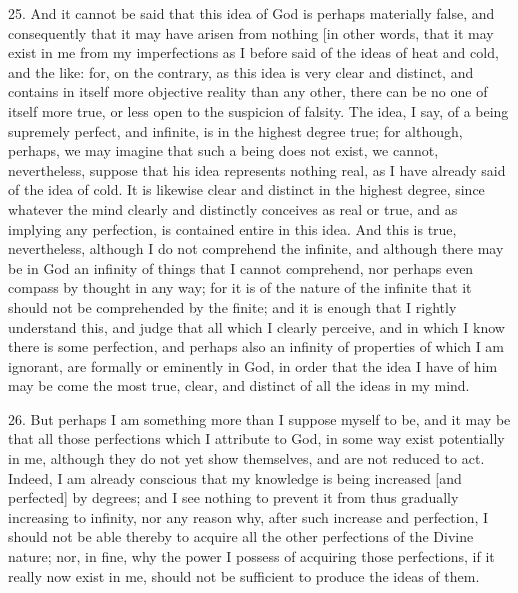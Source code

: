 25. And it cannot be said that this idea of God is perhaps materially false, and consequently that it may have arisen from nothing [in other words, that it may exist in me from my imperfections as I before said of the ideas of heat and cold, and the like: for, on the contrary, as this idea is very clear and distinct, and contains in itself more objective reality than any other, there can be no one of itself more true, or less open to the suspicion of falsity. The idea, I say, of a being supremely perfect, and infinite, is in the highest degree true; for although, perhaps, we may imagine that such a being does not exist, we cannot, nevertheless, suppose that his idea represents nothing real, as I have already said of the idea of cold. It is likewise clear and distinct in the highest degree, since whatever the mind clearly and distinctly conceives as real or true, and as implying any perfection, is contained entire in this idea. And this is true, nevertheless, although I do not comprehend the infinite, and although there may be in God an infinity of things that I cannot comprehend, nor perhaps even compass by thought in any way; for it is of the nature of the infinite that it should not be comprehended by the finite; and it is enough that I rightly understand this, and judge that all which I clearly perceive, and in which I know there is some perfection, and perhaps also an infinity of properties of which I am ignorant, are formally or eminently in God, in order that the idea I have of him may be come the most true, clear, and distinct of all the ideas in my mind.

26. But perhaps I am something more than I suppose myself to be, and it may be that all those perfections which I attribute to God, in some way exist potentially in me, although they do not yet show themselves, and are not reduced to act. Indeed, I am already conscious that my knowledge is being increased [and perfected] by degrees; and I see nothing to prevent it from thus gradually increasing to infinity, nor any reason why, after such increase and perfection, I should not be able thereby to acquire all the other perfections of the Divine nature; nor, in fine, why the power I possess of acquiring those perfections, if it really now exist in me, should not be sufficient to produce the ideas of them.

